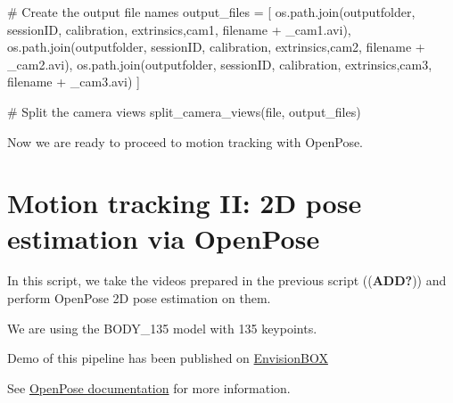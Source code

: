 \documentclass[
  letterpaper,
  DIV=11,
  numbers=noendperiod]{scrreprt}
\newenvironment{Shaded}{\begin{snugshade}}{\end{snugshade}}
\newcommand{\BuiltInTok}[1]{\textcolor[rgb]{0.00,0.23,0.31}{#1}}
\newcommand{\CommentTok}[1]{\textcolor[rgb]{0.37,0.37,0.37}{#1}}
\newcommand{\NormalTok}[1]{\textcolor[rgb]{0.00,0.23,0.31}{#1}}
\newcommand{\OperatorTok}[1]{\textcolor[rgb]{0.37,0.37,0.37}{#1}}
\newcommand{\StringTok}[1]{\textcolor[rgb]{0.13,0.47,0.30}{#1}}
\begin{document}
\begin{Shaded}
\begin{Highlighting}[]
    \CommentTok{\# Create the output file names}
\NormalTok{    output\_files }\OperatorTok{=}\NormalTok{ [}
\NormalTok{        os.path.join(outputfolder, sessionID, }\StringTok{\textquotesingle{}calibration\textquotesingle{}}\NormalTok{, }\StringTok{\textquotesingle{}extrinsics\textquotesingle{}}\NormalTok{,}\StringTok{\textquotesingle{}cam1\textquotesingle{}}\NormalTok{, filename }\OperatorTok{+} \StringTok{\textquotesingle{}\_cam1.avi\textquotesingle{}}\NormalTok{),}
\NormalTok{        os.path.join(outputfolder, sessionID, }\StringTok{\textquotesingle{}calibration\textquotesingle{}}\NormalTok{, }\StringTok{\textquotesingle{}extrinsics\textquotesingle{}}\NormalTok{,}\StringTok{\textquotesingle{}cam2\textquotesingle{}}\NormalTok{, filename }\OperatorTok{+} \StringTok{\textquotesingle{}\_cam2.avi\textquotesingle{}}\NormalTok{),}
\NormalTok{        os.path.join(outputfolder, sessionID, }\StringTok{\textquotesingle{}calibration\textquotesingle{}}\NormalTok{, }\StringTok{\textquotesingle{}extrinsics\textquotesingle{}}\NormalTok{,}\StringTok{\textquotesingle{}cam3\textquotesingle{}}\NormalTok{, filename }\OperatorTok{+} \StringTok{\textquotesingle{}\_cam3.avi\textquotesingle{}}\NormalTok{)}
\NormalTok{    ]}
    
    \CommentTok{\# Split the camera views}
\NormalTok{    split\_camera\_views(}\BuiltInTok{file}\NormalTok{, output\_files)}
\end{Highlighting}
\end{Shaded}

Now we are ready to proceed to motion tracking with OpenPose.


\chapter{Motion tracking II: 2D pose estimation via
OpenPose}\label{motion-tracking-ii-2d-pose-estimation-via-openpose}

In this script, we take the videos prepared in the previous script
((\textbf{ADD?})) and perform OpenPose 2D pose estimation on them.

We are using the BODY\_135 model with 135 keypoints.

Demo of this pipeline has been published on
\href{https://www.envisionbox.org/embedded_openpose_to_pose2sim_tracking.html}{EnvisionBOX}

See
\href{https://github.com/CMU-Perceptual-Computing-Lab/openpose}{OpenPose
documentation} for more information.
\end{document}
